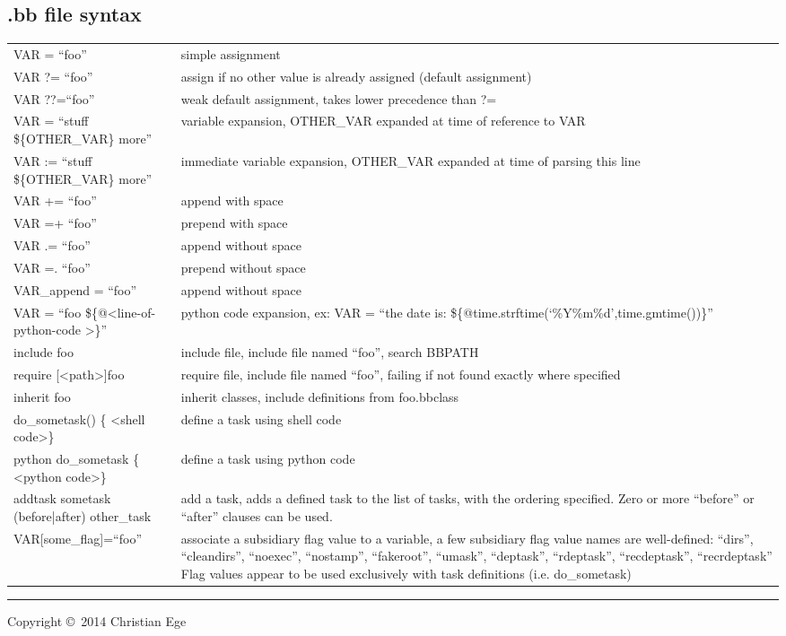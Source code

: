 \documentclass[10pt,a4paper,landscape]{article}
\begin{document}
\begin{multicols}{2}
\section{.bb file syntax}
\begin{tabular}{p{5.5cm}p{\linewidth - 6.4cm}}
VAR = ``foo'' & simple assignment \\
VAR ?= ``foo'' & assign if no other value is already assigned (default assignment) \\
VAR ??=``foo'' & weak default assignment, takes lower precedence than ?= \\
VAR = ``stuff \$\{OTHER\_VAR\} more'' &  variable expansion, OTHER\_VAR expanded at time of reference to VAR \\
VAR := ``stuff \$\{OTHER\_VAR\} more'' & immediate variable expansion, OTHER\_VAR expanded at time of parsing this line  \\
VAR += ``foo'' & append with space \\
VAR =+ ``foo'' & prepend with space \\
VAR .= ``foo'' & append without space \\
VAR =. ``foo'' & prepend without space \\
VAR\_append = ``foo'' & append without space \\
VAR = ``foo \$\{@\textless line-of-python-code \textgreater\}'' & python code expansion, ex: VAR = ``the date is: \$\{@time.strftime(`\%Y\%m\%d',time.gmtime())\}'' \\
include foo & include file, include file named ``foo'', search BBPATH \\
require [\textless path\textgreater]foo & require file, include file named ``foo'', failing if not found exactly where specified \\
inherit foo & inherit classes, include definitions from foo.bbclass \\
do\_sometask() \{   \textless shell code\textgreater  \}  & define a task using shell code \\
python do\_sometask \{ \textless python code\textgreater  \}  & define a task using python code \\
addtask sometask (before|after) other\_task & add a task, adds a defined task to the list of tasks, with the ordering specified. Zero or more ``before'' or ``after'' clauses can be used. \\
VAR[some\_flag]=``foo'' & associate a subsidiary flag value to a variable, a few subsidiary flag value names are well-defined: ``dirs'', ``cleandirs'', ``noexec'', ``nostamp'', ``fakeroot'', ``umask'', ``deptask'', ``rdeptask'', ``recdeptask'', ``recrdeptask''
Flag values appear to be used exclusively with task definitions (i.e. do\_sometask)
\end{tabular}



\rule{\linewidth}{0.25pt}
\scriptsize

Copyright \copyright\ 2014 Christian Ege


\end{multicols}
\end{document}
